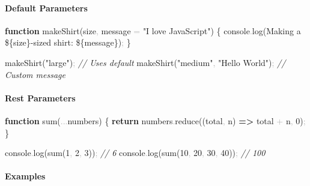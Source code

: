 \documentclass[
  justified,
  openright,
]{tufte-book}
\let\subsection\paragraph
\let\paragraph\paragraph
\newcommand{\KeywordTok}[1]{\textcolor{CodeKeyword}{\textbf{#1}}}  %
\newcommand{\StringTok}[1]{\textcolor{CodeString}{#1}}              %
\newcommand{\CommentTok}[1]{\textcolor{CodeComment}{\textit{#1}}}  %
\newcommand{\CodeNumTok}[1]{\textcolor{CodeNumber}{#1}}             %
\newcommand{\CodeFuncTok}[1]{\textcolor{CodeKeyword}{#1}}           %
\newcommand{\OperatorTok}[1]{\textcolor{DarkGray}{#1}}              %
\newenvironment{Shaded}{%
  \begin{mdframed}[style=TufteCode]%
}{%
  \end{mdframed}%
}
\let\subsection\paragraph
\let\paragraph\paragraph
\begin{document}
\subsection{Default Parameters}\label{default-parameters}

\begin{Shaded}
\begin{Highlighting}[]
\KeywordTok{function} \CodeFuncTok{makeShirt}(size\OperatorTok{,} message \OperatorTok{=} \StringTok{"I love JavaScript"}) \{
  console\OperatorTok{.}\CodeFuncTok{log}(\StringTok{\textasciigrave{}Making a }\StringTok{\$\{}size\StringTok{\}}\StringTok{{-}sized shirt: \textquotesingle{}}\StringTok{\$\{}message\StringTok{\}}\StringTok{\textquotesingle{}\textasciigrave{}})\OperatorTok{;}
\}
 
\CodeFuncTok{makeShirt}(\StringTok{"large"})\OperatorTok{;} \CommentTok{// Uses default}
\CodeFuncTok{makeShirt}(\StringTok{"medium"}\OperatorTok{,} \StringTok{"Hello World"})\OperatorTok{;} \CommentTok{// Custom message}
\end{Highlighting}
\end{Shaded}

\subsection{Rest Parameters}\label{rest-parameters}

\begin{Shaded}
\begin{Highlighting}[]
\KeywordTok{function} \CodeFuncTok{sum}(\OperatorTok{...}numbers) \{
  \KeywordTok{return} numbers\OperatorTok{.}\CodeFuncTok{reduce}((total\OperatorTok{,} n) \KeywordTok{=\textgreater{}} total \OperatorTok{+} n\OperatorTok{,} \CodeNumTok{0})\OperatorTok{;}
\}
 
console\OperatorTok{.}\CodeFuncTok{log}(\CodeFuncTok{sum}(\CodeNumTok{1}\OperatorTok{,} \CodeNumTok{2}\OperatorTok{,} \CodeNumTok{3}))\OperatorTok{;} \CommentTok{// 6}
console\OperatorTok{.}\CodeFuncTok{log}(\CodeFuncTok{sum}(\CodeNumTok{10}\OperatorTok{,} \CodeNumTok{20}\OperatorTok{,} \CodeNumTok{30}\OperatorTok{,} \CodeNumTok{40}))\OperatorTok{;} \CommentTok{// 100}
\end{Highlighting}
\end{Shaded}

\subsection{Examples}\label{examples-19}
\end{document}
